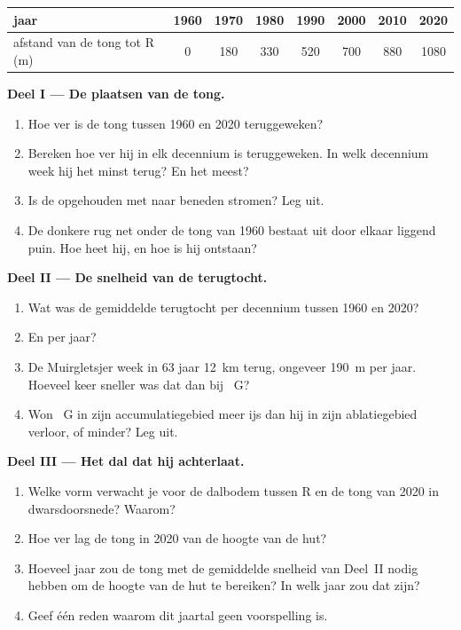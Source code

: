 \begin{problem}
\begin{center}
\smallskip
{\small
\begin{tabular}{|l|c|c|c|c|c|c|c|}
\hline
jaar & 1960 & 1970 & 1980 & 1990 & 2000 & 2010 & 2020 \\
\hline
afstand van de tong tot R (m) & 0 & 180 & 330 & 520 & 700 & 880 & 1080 \\
\hline
\end{tabular}}
\end{center}

\noindent\textbf{Deel I --- De plaatsen van de tong.}\par\nopagebreak
\begin{enumerate}[beginpenalty=10000]
  \item Hoe ver is de tong tussen 1960 en 2020 teruggeweken?
  \item Bereken hoe ver hij in elk decennium is teruggeweken. In welk
        decennium week hij het minst terug? En het meest?
  \item Is de  opgehouden met naar beneden stromen? Leg uit.
  \item De donkere rug net onder de tong van 1960 bestaat uit door elkaar
        liggend puin. Hoe heet hij, en hoe is hij ontstaan?
\end{enumerate}

\noindent\textbf{Deel II --- De snelheid van de terugtocht.}\par\nopagebreak
\begin{enumerate}[resume, beginpenalty=10000]
  \item Wat was de gemiddelde terugtocht per decennium tussen 1960 en
        2020?
  \item En per jaar?
  \item De Muirgletsjer week in 63 jaar \qty{12}{km} terug, ongeveer
        \qty{190}{m} per jaar. Hoeveel keer sneller was dat dan bij
        ~G?
  \item Won ~G in zijn accumulatiegebied meer ijs dan hij in zijn
        ablatiegebied verloor, of minder? Leg uit.
\end{enumerate}

\noindent\textbf{Deel III --- Het dal dat hij achterlaat.}\par\nopagebreak
\begin{enumerate}[resume, beginpenalty=10000]
  \item Welke vorm verwacht je voor de dalbodem tussen R en de tong van
        2020 in dwarsdoorsnede? Waarom?
  \item Hoe ver lag de tong in 2020 van de hoogte van de hut?
  \item Hoeveel jaar zou de tong met de gemiddelde snelheid van Deel~II
        nodig hebben om de hoogte van de hut te bereiken? In welk jaar zou
        dat zijn?
  \item Geef één reden waarom dit jaartal geen voorspelling is.
\end{enumerate}
\end{problem}
